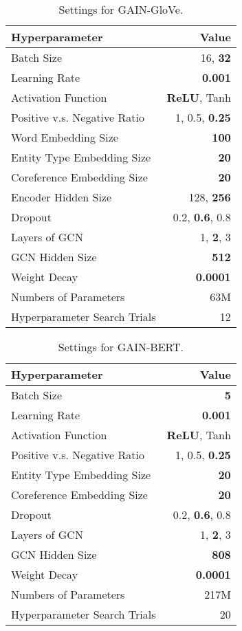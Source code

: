\documentclass[11pt,a4paper]{article}
\begin{document}
\begin{table}[!htbp]
\centering
\begin{tabular}{lr}
\hline
\textbf{Hyperparameter} & Value \\
\hline
Batch Size &  16, \textbf{32} \\
Learning Rate  & \textbf{0.001}  \\
Activation Function & \textbf{ReLU}, Tanh \\
Positive v.s. Negative Ratio & 1, 0.5, \textbf{0.25} \\
Word Embedding Size  & \textbf{100}\\
Entity Type Embedding Size & \textbf{20}  \\
Coreference Embedding Size & \textbf{20}  \\
Encoder Hidden Size &  128, \textbf{256} \\
Dropout &  0.2, \textbf{0.6}, 0.8 \\
Layers of GCN & 1, \textbf{2}, 3 \\
GCN Hidden Size & \textbf{512} \\
Weight Decay & \textbf{0.0001} \\
\hline \hline
Numbers of Parameters & 63M \\ Hyperparameter Search Trials & 12 \\
\hline
\end{tabular}
\caption{Settings for GAIN-GloVe.}
\label{tab:hyperparam1}
\end{table}


\begin{table}[!htbp]
\centering
\begin{tabular}{lr}
\hline
\textbf{Hyperparameter} & Value \\
\hline
Batch Size & \textbf{5} \\
Learning Rate  & \textbf{0.001}  \\
Activation Function & \textbf{ReLU}, Tanh \\
Positive v.s. Negative Ratio & 1, 0.5, \textbf{0.25} \\
Entity Type Embedding Size & \textbf{20} \\
Coreference Embedding Size & \textbf{20} \\
Dropout & 0.2, \textbf{0.6}, 0.8 \\
Layers of GCN & 1, \textbf{2}, 3 \\
GCN Hidden Size & \textbf{808} \\
Weight Decay & \textbf{0.0001} \\
\hline \hline
Numbers of Parameters & 217M \\ Hyperparameter Search Trials & 20 \\
\hline
\end{tabular}
\caption{Settings for GAIN-BERT.}
\label{tab:hyperparam2}
\end{table}
\end{document}
